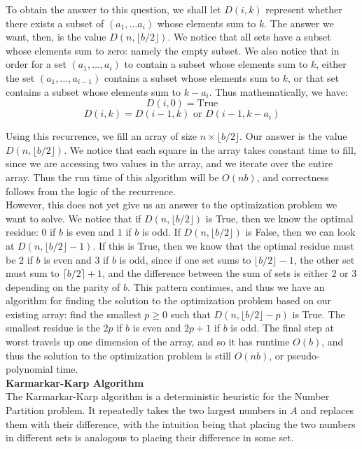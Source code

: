 \documentclass[12pt]{article}
\begin{document}
To obtain the answer to this question, we shall let $D(i, k)$ represent whether there exists a subset of $(a_1, \dots a_i)$ whose elements sum to $k$. The answer we want, then, is the value $D(n, \lfloor b/2 \rfloor)$. We notice that all sets have a subset whose elements sum to zero: namely the empty subset. We also notice that in order for a set $(a_1, \dots, a_i)$ to contain a subset whose elements sum to $k$, either the set $(a_1, \dots, a_{i - 1})$ contains a subset whose elements sum to $k$, or that set contains a subset whose elements sum to $k - a_i$. Thus mathematically, we have: \\
$$D(i, 0) = \text{True}$$
$$D(i, k) = D(i - 1, k) \text{ or } D(i - 1, k - a_i)$$

Using this recurrence, we fill an array of size $n \times \lfloor b/2 \rfloor$. Our answer is the value $D(n, \lfloor b/2 \rfloor)$. We notice that each square in the array takes constant time to fill, since we are accessing two values in the array, and we iterate over the entire array. Thus the run time of this algorithm will be $O(nb)$, and correctness follows from the logic of the recurrence. \\

However, this does not yet give us an answer to the optimization problem we want to solve. We notice that if $D(n, \lfloor b/2 \rfloor)$ is True, then we know the optimal residue: $0$ if $b$ is even and $1$ if $b$ is odd. If $D(n, \lfloor b/2 \rfloor)$ is False, then we can look at $D(n, \lfloor b/2 \rfloor - 1)$. If this is True, then we know that the optimal residue must be $2$ if $b$ is even and $3$ if $b$ is odd, since if one set sums to $\lfloor b/2 \rfloor - 1$, the other set must sum to $\lceil b/2 \rceil + 1$, and the difference between the sum of sets is either $2$ or $3$ depending on the parity of $b$. This pattern continues, and thus we have an algorithm for finding the solution to the optimization problem based on our existing array: find the smallest $p \ge 0$ such that $D(n, \lfloor b/2 \rfloor - p)$ is True. The smallest residue is the $2p$ if $b$ is even and $2p+1$ if $b$ is odd. The final step at worst travels up one dimension of the array, and so it has runtime $O(b)$, and thus the solution to the optimization problem is still $O(nb)$, or pseudo-polynomial time. \\

\textbf{Karmarkar-Karp Algorithm} \\
The Karmarkar-Karp algorithm is a deterministic heuristic for the Number Partition problem. It repeatedly takes the two largest numbers in $A$ and replaces them with their difference, with the intuition being that placing the two numbers in different sets is analogous to placing their difference in some set. \\
\end{document}
